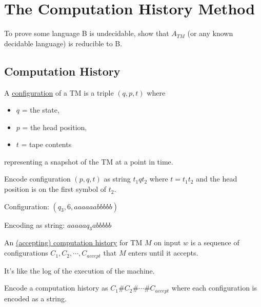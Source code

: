 \chapter{The Computation History Method}

\begin{remark}[Remember]
    To prove some language B is undecidable, show that \(A_{TM}\) (or any known decidable language) is reducible to B. 
\end{remark}

\section{Computation History}
\begin{definition}[TM configuration]
    A \underline{configuration} of a TM is a triple \((q, p, t)\) where
    \begin{itemize}
        \item \(q\) = the state,
        \item \(p\) = the head position,
        \item \(t\) = tape contents   
    \end{itemize} 
    representing a snapshot of the TM at a point in time.
\end{definition}

\begin{remark}
    Encode configuration \((p, q, t)\) as string \(t_1 q t_2\)  where \(t = t_1t_2\) and the head position is on the first symbol of \(t_2\).   
    \begin{example}
        Configuration: \((q_3, 6, aaaaaabbbbb)\) 

        Encoding as string: \(aaaaaq_3abbbbb\) 
    \end{example}
\end{remark}

\begin{definition}
    An \underline{(accepting) computation history} for TM \(M\) on input \(w\) is a sequence of configurations \(C_1, C_2, \cdots, C_{accept}\) that \(M\) enters until it accepts.   
    \begin{intuition}
        It's like the log of the execution of the machine.
    \end{intuition}
\end{definition}

\begin{remark}
    Encode a computation history as \(C_1\#C_2\#\cdots\#C_{accept}\) 
    where each configuration is encoded as a string.
\end{remark}


